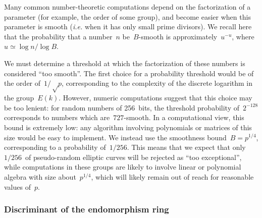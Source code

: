 \documentclass[twocolumn,letterpaper,10pt]{article}
\let\ro\mathcal
\begin{document}
Many common number-theoretic computations depend on
the factorization of a parameter (for example, the order of some group),
and become easier when this parameter is smooth
(\emph{i.e.} when it has only small prime divisors).
We recall here~\cite{jnt1983cep} that the probability that
a number~$n$ be~$B$-smooth is approximately~$u^{-u}$,
where $u ≃ \log n / \log B$.

We must determine a threshold at which the factorization of these
numbers is considered ``too smooth''.
The first choice for a probability threshold would be
of the order of~$1/√p$, corresponding to the complexity of
the discrete logarithm in the group~$E(k)$.
However, numeric computations suggest that this choice may be too lenient:
for random numbers of 256~bits, the threshold probability of~$2^{-128}$
corresponds to numbers which are~$727$-smooth.
In a computational view, this bound is extremely low:
any algorithm involving polynomials or matrices of this size
would be easy to implement.
We instead use the smoothness bound~$B = p^{1/4}$,
corresponding to a probability of~$1/256$.
This means that we expect that only
$1/256$~of pseudo-random elliptic curves
will be rejected as ``too exceptional'',
while computations in these groups
are likely to involve linear or polynomial algebra
with size about~$p^{1/4}$,
which will likely remain out of reach for reasonable values of~$p$.

\subsubsection{Discriminant of the endomorphism ring}
\label{sss:discriminant}

\end{document}

